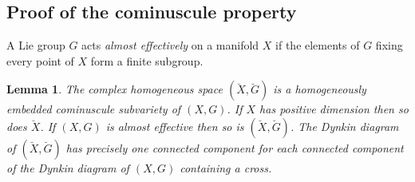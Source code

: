 \documentclass[a4paper,10pt]{amsart}
\newtheorem{lemma}{Lemma}
\theoremstyle{remark}
\begin{document}
\subsection{Proof of the cominuscule property}
A Lie group \(G\) acts \emph{almost effectively} on a manifold \(X\) if the elements of \(G\) fixing every point of \(X\) form a finite subgroup.
\begin{lemma}\label{lemma:associated.cominuscule}
The complex homogeneous space \((\breve{X},\breve{G})\) is a homogeneously embedded cominuscule subvariety of \((X,G)\).
If \(X\) has positive dimension then so does \(\breve{X}\).
If \((X,G)\) is almost effective then so is \((\breve{X},\breve{G})\).
The Dynkin diagram of \((\breve{X},\breve{G})\) has precisely one connected component for each connected component of the Dynkin diagram of \((X,G)\) containing a cross.
\end{lemma}
\end{document}
